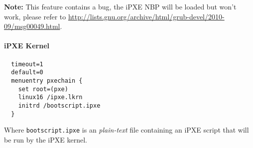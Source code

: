 \documentclass[a4paper,11pt]{article}
\begin{document}
\textbf{Note:} This feature contains a bug, the iPXE NBP will be loaded but won't work, please refer to \url{http://lists.gnu.org/archive/html/grub-devel/2010-09/msg00049.html}.

\paragraph{iPXE Kernel}
\begin{verbatim}
  timeout=1
  default=0
  menuentry pxechain {
    set root=(pxe)
    linux16 /ipxe.lkrn
    initrd /bootscript.ipxe
  }
\end{verbatim}

Where \texttt{bootscript.ipxe} is an \emph{plain-text} file containing an iPXE script that will be run by the iPXE kernel.
\end{document}
